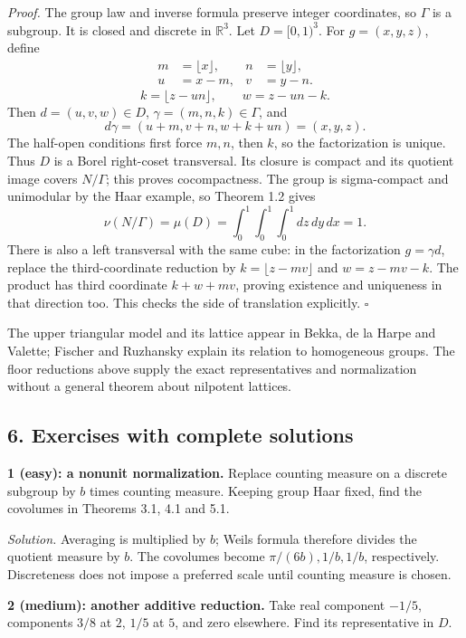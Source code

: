 \documentclass[
  english,
  11pt,
  a4paper,
]{article}
\begin{document}
\emph{Proof.} The group law and inverse formula preserve integer
coordinates, so \(\Gamma\) is a subgroup. It is closed and discrete in
\(\mathbb R^3\). Let \(D=[0,1)^3\). For \(g=(x,y,z)\), define
\[\begin{aligned}
m&=\lfloor x\rfloor,& n&=\lfloor y\rfloor,\\
u&=x-m,& v&=y-n.
\end{aligned}\] \[k=\lfloor z-un\rfloor,\qquad w=z-un-k.\] Then
\(d=(u,v,w)\in D\), \(\gamma=(m,n,k)\in\Gamma\), and
\[d\gamma=(u+m,v+n,w+k+un)=(x,y,z).\] The half-open conditions first
force \(m,n\), then \(k\), so the factorization is unique. Thus \(D\) is
a Borel right-coset transversal. Its closure is compact and its quotient
image covers \(N/\Gamma\); this proves cocompactness. The group is
sigma-compact and unimodular by the Haar example, so Theorem 1.2 gives
\[\nu(N/\Gamma)=\mu(D)=\int_0^1\int_0^1\int_0^1 dz\,dy\,dx=1.\] There is
also a left transversal with the same cube: in the factorization
\(g=\gamma d\), replace the third-coordinate reduction by
\(k=\lfloor z-mv\rfloor\) and \(w=z-mv-k\). The product has third
coordinate \(k+w+mv\), proving existence and uniqueness in that
direction too. This checks the side of translation explicitly.
\(\square\)

The upper triangular model and its lattice appear in Bekka, de la Harpe
and Valette; Fischer and Ruzhansky explain its relation to homogeneous
groups. The floor reductions above supply the exact representatives and
normalization without a general theorem about nilpotent lattices.

\subsection{6. Exercises with complete
solutions}\label{finite-covolume-and-arithmetic-quotients--6-exercises-with-complete-solutions}

\textbf{1 (easy): a nonunit normalization.} Replace counting measure on
a discrete subgroup by \(b\) times counting measure. Keeping group Haar
fixed, find the covolumes in Theorems 3.1, 4.1 and 5.1.

\emph{Solution.} Averaging is multiplied by \(b\);
Weil\textquotesingle s formula therefore divides the quotient measure by
\(b\). The covolumes become \(\pi/(6b),1/b,1/b\), respectively.
Discreteness does not impose a preferred scale until counting measure is
chosen.

\textbf{2 (medium): another additive reduction.} Take real component
\(-1/5\), components \(3/8\) at \(2\), \(1/5\) at \(5\), and zero
elsewhere. Find its representative in \(D\).
\end{document}
